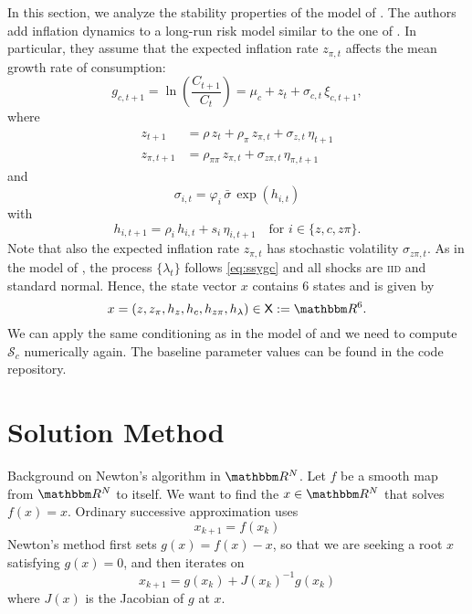 \documentclass[12pt, reqno]{amsart}
\newcommand{\1}{\mathbbm 1}
\newcommand{\sS}{\mathcal S}
\newcommand{\RR}{\mathbbm R}
\newcommand{\XX}{\mathsf X}
\renewcommand{\phi}{\varphi}
\theoremstyle{plain}
\theoremstyle{definition}
\begin{document}
In this section, we analyze the stability properties of the model of
\cite{GomezYaron2020}. The authors add inflation dynamics to a long-run risk
model similar to the one of \cite{schorfheide2018identifying}. In particular,
they assume that the expected inflation rate $z_{\pi,t}$ affects the mean growth
rate of consumption:
%
\begin{equation}\label{eq:gcycg}
	g_{c, t+1} 
	= \ln \left( \frac{C_{t+1}}{C_t} \right)    
	= \mu_c + z_t + \sigma_{c, t} \, \xi_{c, t+1},
\end{equation}
%
where
%
\begin{align*}
	z_{t+1} 
	&= \rho \, z_t + \rho_{\pi} \, z_{\pi,t}+ 
	\sigma_{z, t} \, \eta_{t+1}\\
	z_{\pi,t+1} 
	&= \rho_{\pi \pi} \, z_{\pi,t} + \sigma_{z \pi, t} \, \eta_{\pi,t+1}
\end{align*}
%
and
%
\begin{equation}
	\sigma_{i,t} 
	= \phi_i \, \bar{\sigma} \, \exp(h_{i, t})
\end{equation}
%
with
%
\begin{equation*}
	h_{i, t+1}
	= \rho_i \, h_{i,t} + s_i \, \eta_{i, t+1}
	\quad \text{for } i \in \{z, c, z\pi \}.
\end{equation*}
%
Note that also the expected inflation rate $z_{\pi,t}$ has stochastic volatility
$\sigma_{z\pi,t}$. As in the model of \cite{schorfheide2018identifying}, the
process $\{\lambda_t\}$ follows \eqref{eq:ssygc} and all shocks are
\textsc{iid} and standard normal. Hence, the state vector $x$ contains 6 states
and is given by
%
\begin{equation*}
    x = (z, z_\pi, h_z, h_c, h_{z\pi}, h_\lambda) \in \XX := \RR^6. 
\end{equation*}
%
We can apply the same conditioning as in the model of
\cite{schorfheide2018identifying} and we need to compute $\sS_c$ numerically
again. The baseline parameter values can be found in the code repository.



\section{Solution Method}

Background on Newton's algorithm in $\RR^N$.  Let $f$ be a smooth map from
$\RR^N$ to itself.  We want to find the $x \in \RR^N$ that solves $f(x)=x$.
Ordinary successive approximation uses
%
\begin{equation}
    x_{k+1} = f(x_k)
\end{equation}
%
Newton's method first sets $g(x) = f(x) -x$, so that we are seeking a root $x$
satisfying $g(x)=0$, and then iterates on
%
\begin{equation}
    x_{k+1} = g(x_k) + J(x_k)^{-1} g(x_k)
\end{equation}
%
where $J(x)$ is the Jacobian of $g$ at $x$.
\end{document}
